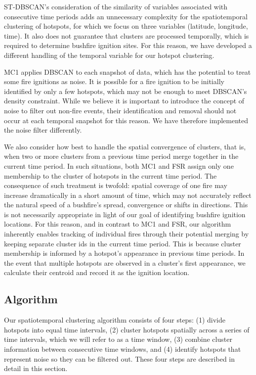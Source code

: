 ST-DBSCAN's consideration of the similarity of variables associated with consecutive time periods adds an unnecessary complexity for the spatiotemporal clustering of hotspots, for which we focus on three variables (latitude, longitude, time). It also does not guarantee that clusters are processed temporally, which is required to determine bushfire ignition sites. For this reason, we have developed a different handling of the temporal variable for our hotspot clustering.

MC1 applies DBSCAN to each snapshot of data, which has the potential to treat some fire ignitions as noise. It is possible for a fire ignition to be initially identified by only a few hotspots, which may not be enough to meet DBSCAN's density constraint. While we believe it is important to introduce the concept of noise to filter out non-fire events, their identification and removal should not occur at each temporal snapshot for this reason. We have therefore implemented the noise filter differently.

We also consider how best to handle the spatial convergence of clusters, that is, when two or more clusters from a previous time period merge together in the current time period. In such situations, both MC1 and FSR assign only one membership to the cluster of hotspots in the current time period. The consequence of such treatment is twofold: spatial coverage of one fire may increase dramatically in a short amount of time, which may not accurately reflect the natural speed of a bushfire's spread, convergence or shifts in directions. This is not necessarily appropriate in light of our goal of identifying bushfire ignition locations. For this reason, and in contrast to MC1 and FSR, our algorithm inherently enables tracking of individual fires through their potential merging by keeping separate cluster ids in the current time period. This is because cluster membership is informed by a hotspot's appearance in previous time periods. In the event that multiple hotspots are observed in a cluster's first appearance, we calculate their centroid and record it as the ignition location.

\hypertarget{algorithm}{%
\subsection{Algorithm}\label{algorithm}}

Our spatiotemporal clustering algorithm consists of four steps: (1) divide hotspots into equal time intervals, (2) cluster hotspots spatially across a series of time intervals, which we will refer to as a time window, (3) combine cluster information between consecutive time windows, and (4) identify hotspots that represent noise so they can be filtered out. These four steps are described in detail in this section.

